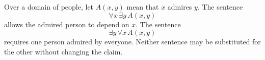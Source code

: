 \begin{example}
Over a domain of people, let \(A(x,y)\) mean that \(x\) admires \(y\).
The sentence
\[
  \forall x\,\exists y\,A(x,y)
\]
allows the admired person to depend on \(x\).  The sentence
\[
  \exists y\,\forall x\,A(x,y)
\]
requires one person admired by everyone.  Neither sentence may be substituted
for the other without changing the claim.
\end{example}

